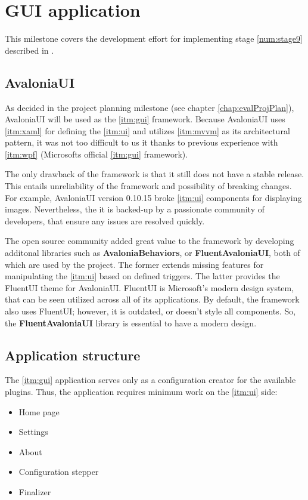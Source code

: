 \chapter{GUI application}

This milestone covers the development effort for implementing stage \ref{num:stage9} described in .

\section{AvaloniaUI}

As decided in the project planning milestone (see chapter \ref{chap:evalProjPlan}), AvaloniaUI will be used as the \ref{itm:gui} framework.
Because AvaloniaUI uses \ref{itm:xaml} for defining the \ref{itm:ui} and utilizes \ref{itm:mvvm} as its architectural pattern, it was not too difficult to us it thanks to previous experience with \ref{itm:wpf} (Microsofts official \ref{itm:gui} framework).

The only drawback of the framework is that it still does not have a stable release. This entails unreliability of the framework and possibility of breaking changes. For example, AvaloniaUI version 0.10.15 broke \ref{itm:ui} components for displaying images. Nevertheless, the it is backed-up by a passionate community of developers, that ensure any issues are resolved quickly.

The open source community added great value to the framework by developing additonal libraries such as \textbf{AvaloniaBehaviors}, or \textbf{FluentAvaloniaUI}, both of which are used by the project. The former extends missing features for manipulating the \ref{itm:ui} based on defined triggers. The latter provides the FluentUI theme for AvaloniaUI. FluentUI is Microsoft's modern design system, that can be seen utilized across all of its applications. By default, the framework also uses FluentUI; however, it is outdated, or doesn't style all components. So, the \textbf{FluentAvaloniaUI} library is essential to have a modern design.

\section{Application structure}

The \ref{itm:gui} application serves only as a configuration creator for the available plugins. Thus, the application requires minimum work on the \ref{itm:ui} side:
\begin{itemize}
    \item Home page
    \item Settings
    \item About
    \item Configuration stepper
    \item Finalizer
\end{itemize}

